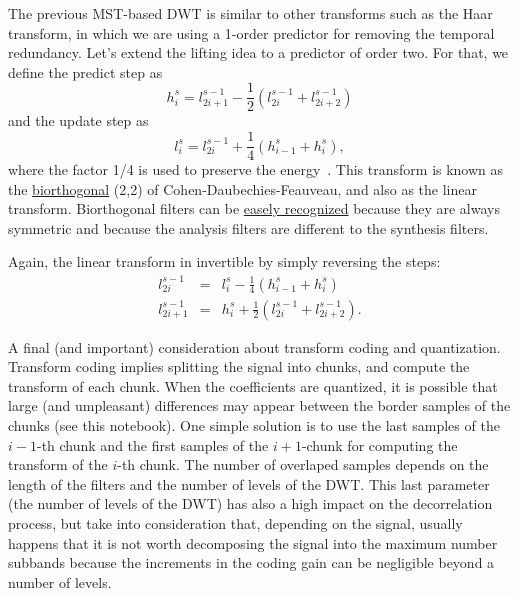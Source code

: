 The previous MST-based DWT is similar to other transforms such as the
Haar transform, in which we are using a 1-order predictor for removing
the temporal redundancy. Let's extend the lifting idea to a predictor
of order two. For that, we define the predict step as
\begin{equation}
  h^s_i = l^{s-1}_{2i+1} - \frac{1}{2}(l^{s-1}_{2i} + l^{s-1}_{2i+2})
\end{equation}
and the update step as
\begin{equation}
  l^s_i = l^{s-1}_{2i} + \frac{1}{4}(h^s_{i-1} + h^s_i),
\end{equation}
where the factor 1/4 is used to preserve the
energy~\cite{sweldens1997building}. This transform is known as the
\href{https://en.wikipedia.org/wiki/Biorthogonal_wavelet}{biorthogonal}
(2,2) of Cohen-Daubechies-Feauveau, and also as the linear transform.
Biorthogonal filters can be \href{http://wavelets.pybytes.com/}{easely
  recognized} because they are always symmetric and because the
analysis filters are different to the synthesis filters.

Again, the linear transform in invertible by simply reversing the
steps:
\begin{equation}
  \begin{array}{rcl}
    l^{s-1}_{2i} & = & l^s_i - \frac{1}{4}(h^s_{i-1} + h^s_i)\\
    l^{s-1}_{2i+1} & = & h^s_i + \frac{1}{2}(l^{s-1}_{2i} + l^{s-1}_{2i+2}).
  \end{array}
\end{equation}

A final (and important) consideration about transform coding and
quantization. Transform coding implies splitting the signal into
chunks, and compute the transform of each chunk. When the coefficients
are quantized, it is possible that large (and umpleasant) differences
may appear between the border samples of the chunks (see this
notebook). One simple solution is to use the last samples of the
$i-1$-th chunk and the first samples of the $i+1$-chunk for computing
the transform of the $i$-th chunk. The number of overlaped samples
depends on the length of the filters and the number of levels of the
DWT. This last parameter (the number of levels of the DWT) has also a
high impact on the decorrelation process, but take into consideration
that, depending on the signal, usually happens that it is not worth
decomposing the signal into the maximum number subbands because the
increments in the coding gain can be negligible beyond a number of
levels.
  

